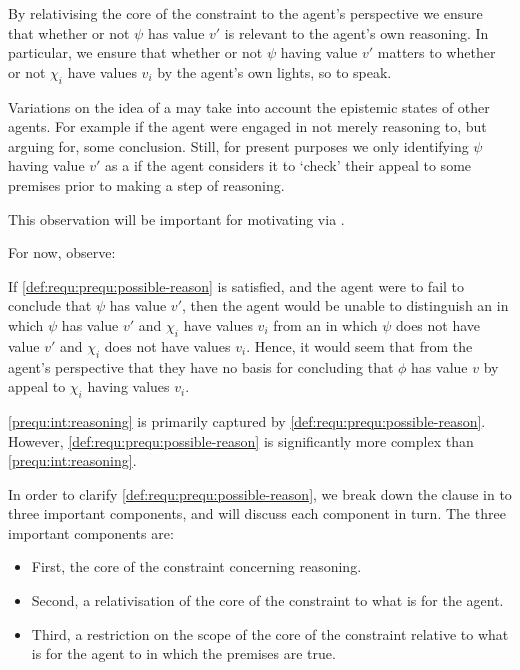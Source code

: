 \begin{note}[Relevance]
  By relativising the core of the constraint to the agent's perspective we ensure that whether or not \(\psi\) has value \(v'\) is relevant to the agent's own reasoning.
  In particular, we ensure that whether or not \(\psi\) having value \(v'\) matters to whether or not \(\chi_{i}\) have values \(v_{i}\) by the agent's own lights, so to speak.

  Variations on the idea of a \prequ{} may take into account the epistemic states of other agents. For example if the agent were engaged in not merely reasoning to, but arguing for, some conclusion.
  Still, for present purposes we only identifying \(\psi\) having value \(v'\) as a \prequ{} if the agent considers it \epVAd{} to `check' their appeal to some premises prior to making a step of reasoning.

  This observation will be important for motivating \ideaCS{} via \ideaS{}.

  For now, observe:

  If \ref{def:requ:prequ:possible-reason} is satisfied, and the agent were to fail to conclude that \(\psi\) has value \(v'\), then the agent would be unable to distinguish an \epVW{} in which \(\psi\) has value \(v'\) and \(\chi_{i}\) have values \(v_{i}\) from an \epVW{} in which \(\psi\) does not have value \(v'\) and \(\chi_{i}\) does not have values \(v_{i}\).
  Hence, it would seem that from the agent's perspective that they have no basis for concluding that \(\phi\) has value \(v\) by appeal to \(\chi_{i}\) having values \(v_{i}\).
\end{note}


\begin{note}
  \ref{prequ:int:reasoning} is primarily captured by \ref{def:requ:prequ:possible-reason}.
  However, \ref{def:requ:prequ:possible-reason} is significantly more complex than \ref{prequ:int:reasoning}.

  In order to clarify \ref{def:requ:prequ:possible-reason}, we break down the clause in to three important components, and will discuss each component in turn.
  The three important components are:
  \begin{itemize}
  \item
    First, the core of the constraint concerning reasoning.
  \item
    Second, a relativisation of the core of the constraint to what is \epVAd{} for the agent.
  \item
    Third, a restriction on the scope of the core of the constraint relative to what is \epVAd{} for the agent to  in which the premises are true.
  \end{itemize}
\end{note}

